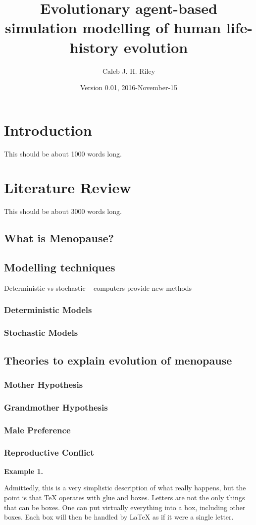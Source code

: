 \documentclass[authoryearcitations]{UoYCSproject}
\author{Caleb J. H. Riley}
\title{Evolutionary agent-based simulation modelling of human life-history evolution}
\date{Version 0.01, 2016-November-15}
\begin{document}
\maketitle
\listoffigures
\listoftables

\cleardoublepage

\chapter{Introduction}
\label{cha:Introduction}
This should be about 1000 words long.

\chapter{Literature Review}
\label{cha:Literature Review}
This should be about 3000 words long.

\section{What is Menopause?}

\section{Modelling techniques}
Deterministic vs stochastic -- computers provide new methods
\subsection{Deterministic Models}
\subsection{Stochastic Models}

\section{Theories to explain evolution of menopause}
\subsection{Mother Hypothesis}
\subsection{Grandmother Hypothesis}
\subsection{Male Preference}
\subsection{Reproductive Conflict}
\begin{framed}
\noindent \textbf{Example 1.}

Admittedly, this is a very simplistic description of what really happens, but the point is that TeX operates with glue and boxes. Letters are not the only things that can be boxes. One can put virtually everything into a box, including other boxes. Each box will then be handled by LaTeX as if it were a single letter.
\end{framed}
\end{document}
